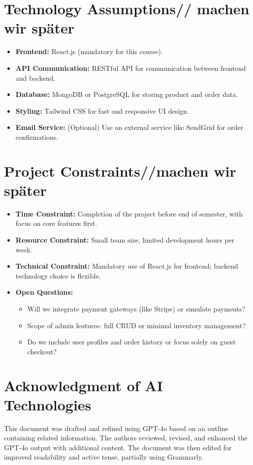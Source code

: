 \documentclass[a4paper,12pt]{article}
\begin{document}
	\section{Technology Assumptions// machen wir später}
	\begin{itemize}
		\item \textbf{Frontend:} React.js (mandatory for this course).
	
		\item \textbf{API Communication:} RESTful API for communication between frontend and backend.
		\item \textbf{Database:} MongoDB or PostgreSQL for storing product and order data.
		\item \textbf{Styling:} Tailwind CSS for fast and responsive UI design.
		\item \textbf{Email Service:} (Optional) Use an external service like SendGrid for order confirmations.
	\end{itemize}
	
	\section{Project Constraints//machen wir später }
	\begin{itemize}
		\item \textbf{Time Constraint:} Completion of the project before end of semester, with focus on core features first.
		\item \textbf{Resource Constraint:} Small team size, limited development hours per week.
		\item \textbf{Technical Constraint:} Mandatory use of React.js for frontend; backend technology choice is flexible.
		\item \textbf{Open Questions:}
		\begin{itemize}
			\item Will we integrate payment gateways (like Stripe) or simulate payments?
			\item Scope of admin features: full CRUD or minimal inventory management?
			\item Do we include user profiles and order history or focus solely on guest checkout?
		\end{itemize}
	\end{itemize}
	
	\section{Acknowledgment of AI Technologies}
	This document was drafted and refined using GPT-4o based on an outline containing related information. The authors reviewed, revised, and enhanced the GPT-4o output with additional content. The document was then edited for improved readability and active tense, partially using Grammarly.
	
\end{document}
